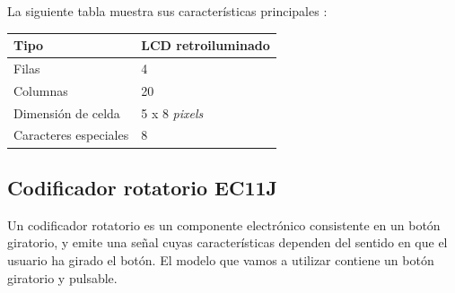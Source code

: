 \smallskip

La siguiente tabla muestra sus características principales \cite{datasheet_lcd}:

\smallskip

\begin{center}
	\begin{tabular}{|l|l|}
		\hline Tipo & LCD retroiluminado \\ 
		\hline Filas & 4 \\ 
		\hline Columnas & 20 \\ 
		\hline Dimensión de celda & 5 x 8 \textit{pixels} \\ 
		\hline Caracteres especiales & 8 \\ 
		\hline 
	\end{tabular}
	\smallskip
\end{center} 

\smallskip

\subsection{Codificador rotatorio EC11J}

Un codificador rotatorio es un componente electrónico consistente en un botón giratorio, y emite una señal cuyas características dependen del sentido en que el usuario ha girado el botón. El modelo que vamos a utilizar contiene un botón giratorio y pulsable. \cite{rotary}

\smallskip

